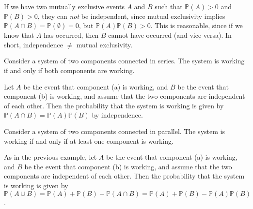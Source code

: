 \begin{remark}
    If we have two mutually exclusive events $A$ and $B$ such that $\mathbb{P}(A) > 0$ and $\mathbb{P}(B) > 0$, they can \emph{not} be independent, since mutual exclusivity implies $\mathbb{P}(A \cap B) = \mathbb{P}(\emptyset) = 0$, but $\mathbb{P}(A)\mathbb{P}(B) > 0$. This is reasonable, since if we know that $A$ has occurred, then $B$ cannot have occurred (and vice versa). In short, independence $\neq$ mutual exclusivity.
\end{remark}

\begin{example}
    Consider a system of two components connected in series. The system is working if and only if both components are working.

    \begin{center}
    \end{center}

    Let $A$ be the event that component (a) is working, and $B$ be the event that component (b) is working, and assume that the two components are independent of each other. Then the probability that the system is working is given by $\mathbb{P}(A \cap B) = \mathbb{P}(A)\mathbb{P}(B)$ by independence.
\end{example}

\begin{example}
    Consider a system of two components connected in parallel. The system is working if and only if at least one component is working.

    \begin{center}
    \end{center}

    As in the previous example, let $A$ be the event that component (a) is working, and $B$ be the event that component (b) is working, and assume that the two components are independent of each other. Then the probability that the system is working is given by $\mathbb{P}(A \cup B) = \mathbb{P}(A) + \mathbb{P}(B) - \mathbb{P}(A \cap B) = \mathbb{P}(A) + \mathbb{P}(B) - \mathbb{P}(A)\mathbb{P}(B)$.
\end{example}

